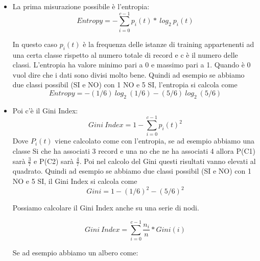 \documentclass[14pt]{extreport}
\begin{document}
\begin{itemize}
    \item La prima misurazione possibile è l'entropia:
        \begin{equation}
            Entropy = - \sum\limits_{i=0}^{c-1} p_i(t)* \ log_2\ p_i(t)
        \end{equation}
        
    In questo caso $p_i(t)$ è la frequenza delle istanze di training appartenenti ad una certa classe rispetto al numero totale di record e c è il numero delle classi.
    L'entropia ha valore minimo pari a 0 e massimo pari a 1. Quando è 0 vuol dire che i dati sono divisi molto bene. Quindi ad esempio se abbiamo due classi possibil (SI e NO) con 1 NO e 5 SI, l'entropia si calcola come \newline
    \begin{equation}
            Entropy = - (1/6) \ log_2 \ (1/6) - (5/6) \ log_2 \ (5/6)
    \end{equation}
    
    \item Poi c'è il Gini Index:
        \begin{equation}
            Gini \ Index = 1 - \sum\limits_{i=0}^{c-1} p_i(t)^2
        \end{equation}
    Dove $P_i(t)$ viene calcolato come con l'entropia, se ad esempio abbiamo una classe Si che ha associati 3 record e una no che ne ha associati 4 allora P(C1) sarà $\frac{3}{7}$ e P(C2) sarà $\frac{4}{7}$.
    Poi nel calcolo del Gini questi risultati vanno elevati al quadrato.
    Quindi ad esempio se abbiamo due classi possibil (SI e NO) con 1 NO e 5 SI, il Gini Index si calcola come \newline
    \begin{equation}
            Gini = 1 - (1/6)^2 - (5/6)^2
    \end{equation}
    
    Possiamo calcolare il Gini Index anche su una serie di nodi.
    
    \begin{equation}
    Gini \ Index = \sum\limits_{i=0}^{c-1} \frac{n_i}{n} * Gini(i)
    \end{equation} 
        
    Se ad esempio abbiamo un albero come:
    

\end{itemize}
\end{document}
